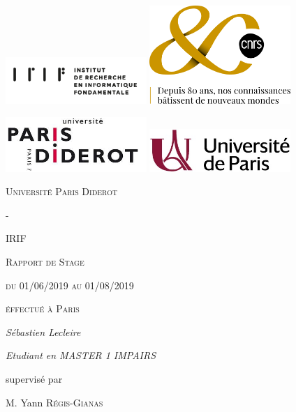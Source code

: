 \documentclass{article}
\begin{document}
\begin{titlepage}
	\centering
	\includegraphics[width=0.4\textwidth]{irif_horizontal}
	\includegraphics[width=0.4\textwidth]{Logo80ANS_OR}\par\vspace{1cm}
	\includegraphics[width=0.4\textwidth]{logop7}
	\includegraphics[width=0.4\textwidth]{Universite_Paris_logo_horizontal}\par\vspace{1cm}
	{\scshape\LARGE Université Paris Diderot \par}
	{\scshape\Large -\par}

	{\scshape\LARGE IRIF \par}
	\vspace{1cm}
	{\scshape\Large Rapport de Stage\par}
	{\scshape\Large du 01/06/2019 au 01/08/2019\par}
	\vspace{1.5cm}
	{\scshape\Large éffectué à Paris\par}
	\vspace{1.5cm}
	{\Large\itshape Sébastien Lecleire\par}
	{\Large\itshape Etudiant en MASTER 1 IMPAIRS\par}
	\vfill
	supervisé par\par
	M. Yann \textsc{Régis-Gianas}

	\vfill
\end{titlepage}
\end{document}
